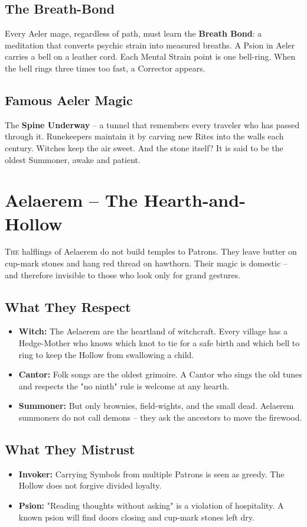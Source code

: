 \documentclass[10pt,a5paper]{book}
\begin{document}
\subsection*{The Breath-Bond}
Every Aeler mage, regardless of path, must learn the \textbf{Breath Bond}: a meditation that converts psychic strain into measured breaths. A Psion in Aeler carries a bell on a leather cord. Each Mental Strain point is one bell-ring. When the bell rings three times too fast, a Corrector appears.

\subsection*{Famous Aeler Magic}
The \textbf{Spine Underway} -- a tunnel that remembers every traveler who has passed through it. Runekeepers maintain it by carving new Rites into the walls each century. Witches keep the air sweet. And the stone itself? It is said to be the oldest Summoner, awake and patient.

\section{Aelaerem -- The Hearth-and-Hollow}

\lettrine{T}{he} halflings of Aelaerem do not build temples to Patrons. They leave butter on cup-mark stones and hang red thread on hawthorn. Their magic is domestic -- and therefore invisible to those who look only for grand gestures.

\subsection*{What They Respect}
\begin{itemize}
    \item \textbf{Witch:} The Aelaerem are the heartland of witchcraft. Every village has a Hedge-Mother who knows which knot to tie for a safe birth and which bell to ring to keep the Hollow from swallowing a child.
    \item \textbf{Cantor:} Folk songs are the oldest grimoire. A Cantor who sings the old tunes and respects the "no ninth" rule is welcome at any hearth.
    \item \textbf{Summoner:} But only brownies, field-wights, and the small dead. Aelaerem summoners do not call demons -- they ask the ancestors to move the firewood.
\end{itemize}

\subsection*{What They Mistrust}
\begin{itemize}
    \item \textbf{Invoker:} Carrying Symbols from multiple Patrons is seen as greedy. The Hollow does not forgive divided loyalty.
    \item \textbf{Psion:} "Reading thoughts without asking" is a violation of hospitality. A known psion will find doors closing and cup-mark stones left dry.
\end{itemize}
\end{document}
